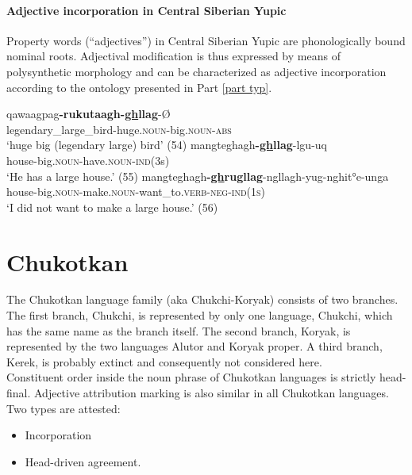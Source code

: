 \paragraph{Adjective incorporation in Central Siberian Yupic}
Property words (“adjectives”) in Central Siberian Yupic are phonologically bound nominal roots. Adjectival modification is thus expressed by means of polysynthetic morphology and can be characterized as adjective incorporation according to the ontology presented in Part \ref{part typ}.
\begin{exe}
\ex {}
\begin{xlist}
\ex
\gll	qawaagpag\textbf{-rukutaagh-\underline{gh}llag}-Ø\\
	legendary\_large\_bird-huge.\textsc{noun}-big.\textsc{noun}-\textsc{abs}\\
\glt	‘huge big (legendary large) bird’ (54)
\ex	
\gll	mangteghagh\textbf{-\underline{gh}llag}-lgu-uq\\
	house-big.\textsc{noun}-have.\textsc{noun}-\textsc{ind}(3s)\\
\glt	‘He has a large house.’ (55)
\ex	
\gll	mangteghagh\textbf{-\underline{gh}rugllag}-ngllagh-yug-nghit°e-unga\\
	house-big.\textsc{noun}-make.\textsc{noun}-want\_to.\textsc{verb}-\textsc{neg}-\textsc{ind(1s)}\\
\glt	‘I did not want to make a large house.’ (56)
\end{xlist}
\end{exe}

\section{Chukotkan}
The Chukotkan language family (aka Chukchi-Koryak) consists of two branches. The first branch, Chukchi, is represented by only one language, Chukchi, which has the same name as the branch itself. The second branch, Koryak, is represented by the two languages Alutor and Koryak proper. A third branch, Kerek, is probably extinct \cite[253]{salminen2007} and consequently not considered here.\\

\noindent Constituent order inside the noun phrase of Chukotkan languages is strictly head-final. Adjective attribution marking is also similar in all Chukotkan languages. Two types are attested:
\begin{itemize}
\item Incorporation
\item Head-driven agreement.
\end{itemize}


